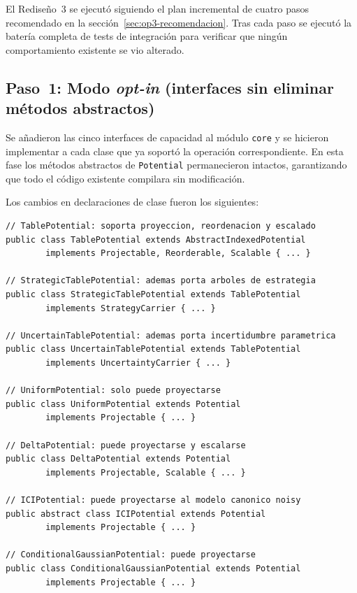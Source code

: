 \documentclass[11pt,a4paper]{article}
\newcommand{\code}[1]{\texttt{#1}}
\begin{document}
El Rediseño~3 se ejecutó siguiendo el plan incremental de cuatro pasos
recomendado en la sección~\ref{sec:op3-recomendacion}.  Tras cada paso se
ejecutó la batería completa de tests de integración para verificar que
ningún comportamiento existente se vio alterado.

\subsection{Paso~1: Modo \emph{opt-in} (interfaces sin eliminar métodos abstractos)}
\label{sec:impl-paso1}

Se añadieron las cinco interfaces de capacidad al módulo \code{core} y se
hicieron implementar a cada clase que ya soportó la operación correspondiente.
En esta fase los métodos abstractos de \code{Potential} permanecieron intactos,
garantizando que todo el código existente compilara sin modificación.

Los cambios en declaraciones de clase fueron los siguientes:

\begin{lstlisting}[caption={Declaraciones de clase en el Paso~1 (módulo \code{core})}]
// TablePotential: soporta proyeccion, reordenacion y escalado
public class TablePotential extends AbstractIndexedPotential
        implements Projectable, Reorderable, Scalable { ... }

// StrategicTablePotential: ademas porta arboles de estrategia
public class StrategicTablePotential extends TablePotential
        implements StrategyCarrier { ... }

// UncertainTablePotential: ademas porta incertidumbre parametrica
public class UncertainTablePotential extends TablePotential
        implements UncertaintyCarrier { ... }

// UniformPotential: solo puede proyectarse
public class UniformPotential extends Potential
        implements Projectable { ... }

// DeltaPotential: puede proyectarse y escalarse
public class DeltaPotential extends Potential
        implements Projectable, Scalable { ... }

// ICIPotential: puede proyectarse al modelo canonico noisy
public abstract class ICIPotential extends Potential
        implements Projectable { ... }

// ConditionalGaussianPotential: puede proyectarse
public class ConditionalGaussianPotential extends Potential
        implements Projectable { ... }
\end{lstlisting}
\end{document}
